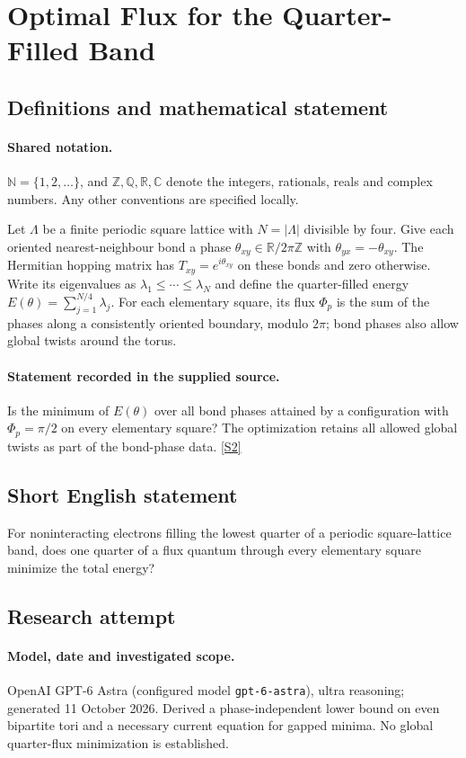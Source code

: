 \documentclass[11pt]{article}
\newcommand{\sref}[2]{\hyperlink{source:#1:#2}{[S#2]}}
\begin{document}
\section{Optimal Flux for the Quarter-Filled Band}\label{statement}

\subsection{Definitions and mathematical statement}

\paragraph{Shared notation.}$\mathbb N=\{1,2,\ldots\}$, and $\mathbb Z,\mathbb Q,\mathbb R,\mathbb C$ denote the integers, rationals, reals and complex numbers. Any other conventions are specified locally.


Let $\Lambda$ be a finite periodic square lattice with $N=|\Lambda|$ divisible by four. Give each oriented nearest-neighbour bond a phase $\theta_{xy}\in\mathbb R/2\pi\mathbb Z$ with $\theta_{yx}=-\theta_{xy}$. The Hermitian hopping matrix has $T_{xy}=e^{i\theta_{xy}}$ on these bonds and zero otherwise. Write its eigenvalues as $\lambda_1\le\cdots\le\lambda_N$ and define the quarter-filled energy $E(\theta)=\sum_{j=1}^{N/4}\lambda_j$. For each elementary square, its flux $\Phi_p$ is the sum of the phases along a consistently oriented boundary, modulo $2\pi$; bond phases also allow global twists around the torus.
\paragraph{Statement recorded in the supplied source.}
Is the minimum of $E(\theta)$ over all bond phases attained by a configuration with $\Phi_p=\pi/2$ on every elementary square? The optimization retains all allowed global twists as part of the bond-phase data. \sref{statement}{2}
\subsection{Short English statement}
For noninteracting electrons filling the lowest quarter of a periodic square-lattice band, does one quarter of a flux quantum through every elementary square minimize the total energy?
\subsection{Research attempt}
\paragraph{Model, date and investigated scope.}
OpenAI GPT-6 Astra (configured model \texttt{gpt-6-astra}), ultra reasoning; generated 11 October 2026. Derived a phase-independent lower bound on even bipartite tori and a necessary current equation for gapped minima. No global quarter-flux minimization is established.
\end{document}

